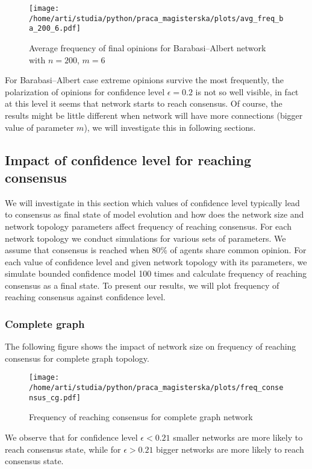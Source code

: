 \documentclass{article}
\begin{document}
\begin{figure}[H]
		\centering
		\texttt{[image: /home/arti/studia/python/praca\_magisterska/plots/avg\_freq\_ba\_200\_6.pdf]}
		\caption{Average frequency of final opinions for Barabasi--Albert network with $n=200$, $m=6$}
\end{figure}

For Barabasi--Albert case extreme opinions survive the most frequently, the polarization of opinions for confidence level $\epsilon=0.2$ is not so well visible, in fact at this level it seems that network starts to reach consensus. Of course, the results might be little different when network will have more connections (bigger value of parameter $m$), we will investigate this in following sections.

\subsection{Impact of confidence level for reaching consensus}
We will investigate in this section which values of confidence level typically lead to consensus as final state of model evolution and how does the network size and network topology parameters affect frequency of reaching consensus. For each network topology we conduct simulations for various sets of parameters. We assume that consensus is reached when 80\% of agents share common opinion. For each value of confidence level and given network topology with its parameters, we simulate bounded confidence model 100 times and calculate frequency of reaching consensus as a final state. To present our results, we will plot frequency of reaching consensus against confidence level.

\subsubsection{Complete graph}
The following figure shows the impact of network size on frequency of reaching consensus for complete graph topology.
\begin{figure}[H]
		\centering
		\texttt{[image: /home/arti/studia/python/praca\_magisterska/plots/freq\_consensus\_cg.pdf]}
		\caption{Frequency of reaching consensus for complete graph network}
\end{figure}

We observe that for confidence level $\epsilon<0.21$ smaller networks are more likely to reach consensus state, while for $\epsilon>0.21$ bigger networks are more likely to reach consensus state. 
\indent
\end{document}
